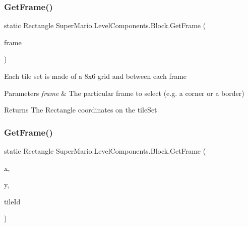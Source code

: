 \subsubsection{\texorpdfstring{Get\+Frame()}{GetFrame()}\hspace{0.1cm}{\footnotesize\ttfamily [1/2]}}
{\footnotesize\ttfamily static Rectangle Super\+Mario.\+Level\+Components.\+Block.\+Get\+Frame (\begin{DoxyParamCaption}\item[{\mbox{\hyperlink{namespace_super_mario_1_1_level_components_a6fb13645a44790821090630fdf2b1afd}{Tile\+Mapping}}}]{frame }\end{DoxyParamCaption})\hspace{0.3cm}{\ttfamily [static]}}



Each tile set is made of a 8x6 grid and between each frame 


\begin{DoxyParams}{Parameters}
{\em frame} & The particular frame to select (e.\+g. a corner or a border)\\
\hline
\end{DoxyParams}
\begin{DoxyReturn}{Returns}
The Rectangle coordinates on the tile\+Set
\end{DoxyReturn}
\mbox{\label{class_super_mario_1_1_level_components_1_1_block_a507402c0bd93c4659b28144580460ab9}} 
\subsubsection{\texorpdfstring{Get\+Frame()}{GetFrame()}\hspace{0.1cm}{\footnotesize\ttfamily [2/2]}}
{\footnotesize\ttfamily static Rectangle Super\+Mario.\+Level\+Components.\+Block.\+Get\+Frame (\begin{DoxyParamCaption}\item[{int}]{x,  }\item[{int}]{y,  }\item[{int}]{tile\+Id }\end{DoxyParamCaption})\hspace{0.3cm}{\ttfamily [static]}}



